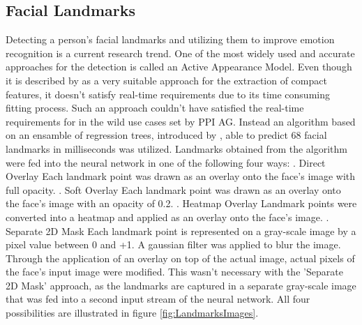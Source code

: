\subsection{Facial Landmarks}
Detecting a person's facial landmarks and utilizing them to improve emotion recognition is a current research trend. One of the most widely used and accurate approaches for the detection is called an Active Appearance Model. Even though it is described by \citet{Gao:2010:ActiveAppearanceModels} as a very suitable approach for the extraction of compact features, it doesn't satisfy real-time requirements due to its time consuming fitting process.
\newline\newline
Such an approach couldn't have satisfied the real-time requirements for in the wild use cases set by PPI AG. Instead an algorithm based on an ensamble of regression trees, introduced by \citet{Kazemi:2014:ShapePredictor}, able to predict 68 facial landmarks in milliseconds was utilized.
\newline\newline
Landmarks obtained from the algorithm were fed into the neural network in one of the following four ways: 
\newline{}. Direct Overlay\newline
Each landmark point was drawn as an overlay onto the face's image with full opacity.
\newline{}. Soft Overlay\newline
Each landmark point was drawn as an overlay onto the face's image with an opacity of 0.2.
\newline{}. Heatmap Overlay\newline
Landmark points were converted into a heatmap and applied as an overlay onto the face's image.
\newline{}. Separate 2D Mask\newline
Each landmark point is represented on a gray-scale image by a pixel value between 0 and +1. A gaussian filter was applied to blur the image.
\newline\newline
Through the application of an overlay on top of the actual image, actual pixels of the face's input image were modified. This wasn't necessary with the 'Separate 2D Mask' approach, as the landmarks are captured in a separate gray-scale image that was fed into a second input stream of the neural network.
\newline\newline
All four possibilities are illustrated in figure \ref{fig:LandmarksImages}.

